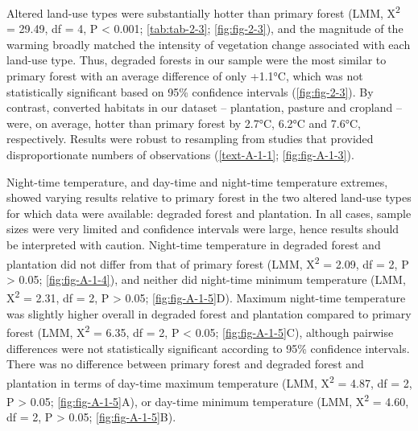 \documentclass[12pt,a4paper,]{report}
\theoremstyle{definition}
\theoremstyle{definition}
\theoremstyle{definition}
\theoremstyle{remark}
\begin{document}
Altered land-use types were substantially hotter than primary forest
(LMM, Χ\textsuperscript{2} = 29.49, df = 4, P \textless{} 0.001;
\autoref{tab:tab-2-3}; \autoref{fig:fig-2-3}), and the magnitude of the
warming broadly matched the intensity of vegetation change associated
with each land-use type. Thus, degraded forests in our sample were the
most similar to primary forest with an average difference of only
+1.1°C, which was not statistically significant based on 95\% confidence
intervals (\autoref{fig:fig-2-3}). By contrast, converted habitats in
our dataset -- plantation, pasture and cropland -- were, on average,
hotter than primary forest by 2.7°C, 6.2°C and 7.6°C, respectively.
Results were robust to resampling from studies that provided
disproportionate numbers of observations (\autoref{text-A-1-1};
\autoref{fig:fig-A-1-3}).

Night-time temperature, and day-time and night-time temperature
extremes, showed varying results relative to primary forest in the two
altered land-use types for which data were available: degraded forest
and plantation. In all cases, sample sizes were very limited and
confidence intervals were large, hence results should be interpreted
with caution. Night-time temperature in degraded forest and plantation
did not differ from that of primary forest (LMM, Χ\textsuperscript{2} =
2.09, df = 2, P \textgreater{} 0.05; \autoref{fig:fig-A-1-4}), and
neither did night-time minimum temperature (LMM, Χ\textsuperscript{2} =
2.31, df = 2, P \textgreater{} 0.05; \autoref{fig:fig-A-1-5}D). Maximum
night-time temperature was slightly higher overall in degraded forest
and plantation compared to primary forest (LMM, Χ\textsuperscript{2} =
6.35, df = 2, P \textless{} 0.05; \autoref{fig:fig-A-1-5}C), although
pairwise differences were not statistically significant according to
95\% confidence intervals. There was no difference between primary
forest and degraded forest and plantation in terms of day-time maximum
temperature (LMM, Χ\textsuperscript{2} = 4.87, df = 2, P \textgreater{}
0.05; \autoref{fig:fig-A-1-5}A), or day-time minimum temperature (LMM,
Χ\textsuperscript{2} = 4.60, df = 2, P \textgreater{} 0.05;
\autoref{fig:fig-A-1-5}B).
\end{document}
